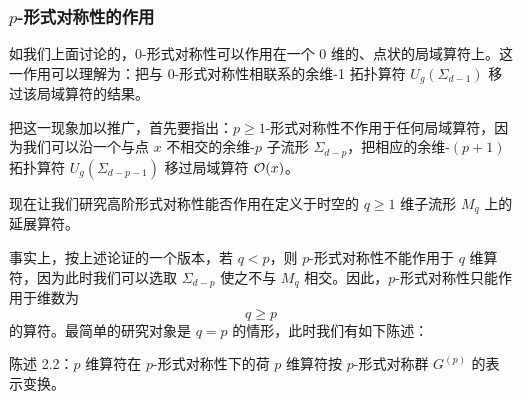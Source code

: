 
\subsubsection{$p$-形式对称性的作用}

 如我们上面讨论的，0-形式对称性可以作用在一个 0 维的、点状的局域算符上。这一作用可以理解为：把与 0-形式对称性相联系的余维-1 拓扑算符 $U_g(\Sigma_{d-1})$ 移过该局域算符的结果。

把这一现象加以推广，首先要指出：$p\ge1$-形式对称性不作用于任何局域算符，因为我们可以沿一个与点 $x$ 不相交的余维-$p$ 子流形 $\Sigma_{d-p}$，把相应的余维-$(p+1)$ 拓扑算符 $U_g(\Sigma_{d-p-1})$ 移过局域算符 $\mathcal{O}(x)$。


 现在让我们研究高阶形式对称性能否作用在定义于时空的 $q\ge1$ 维子流形 $M_q$ 上的延展算符。

事实上，按上述论证的一个版本，若 $q<p$，则 $p$-形式对称性不能作用于 $q$ 维算符，因为此时我们可以选取 $\Sigma_{d-p}$ 使之不与 $M_q$ 相交。因此，$p$-形式对称性只能作用于维数为
\begin{equation}
  q\ge p \tag{2.56}
\end{equation}
的算符。最简单的研究对象是 $q=p$ 的情形，此时我们有如下陈述：

\begin{statementbox}{陈述 2.2：$p$ 维算符在 $p$-形式对称性下的荷}
$p$ 维算符按 $p$-形式对称群 $G^{(p)}$ 的表示变换。
\end{statementbox}

